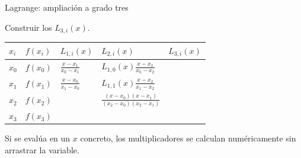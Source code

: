 \documentclass[original_version/main.tex]{subfiles}
\begin{document}
\begin{frame}[t]{Lagrange: ampliación a grado tres}
\par\noindent\begin{minipage}[t][12mm][t]{\textwidth}\small\strut Construir los $L_{3,i}(x)$.\end{minipage}\par\nointerlineskip
\begin{minipage}[t]{\textwidth}\begingroup\scriptsize\setlength{\tabcolsep}{3pt}\begin{center}\begin{tabular}{|C{.065\textwidth}|C{.095\textwidth}|C{.19\textwidth}|C{.25\textwidth}|C{.25\textwidth}|}\hline
\rule[-2mm]{0pt}{6mm}$x_i$&$f(x_i)$&$L_{1,i}(x)$&$L_{2,i}(x)$&$L_{3,i}(x)$\\\hline
\rule[-2.5mm]{0pt}{9mm}$x_0$&$f(x_0)$&$\frac{x-x_1}{x_0-x_1}$&$L_{1,0}(x)\frac{x-x_2}{x_0-x_2}$&\\\hline
\rule[-2.5mm]{0pt}{9mm}$x_1$&$f(x_1)$&$\frac{x-x_0}{x_1-x_0}$&$L_{1,1}(x)\frac{x-x_2}{x_1-x_2}$&\\\hline
\rule[-2.5mm]{0pt}{9mm}$x_2$&$f(x_2)$&&$\frac{(x-x_0)(x-x_1)}{(x_2-x_0)(x_2-x_1)}$&\\\hline
\rule[-2.5mm]{0pt}{9mm}$x_3$&$f(x_3)$&&&\\\hline
\end{tabular}\end{center}\endgroup\par
\end{minipage}\par\small Si se evalúa en un $x$ concreto, los multiplicadores se calculan numéricamente sin arrastrar la variable.
\end{frame}
\end{document}
